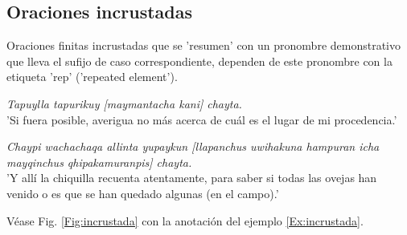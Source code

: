 \documentclass[a4paper,11pt,DIV12]{scrartcl}
\begin{document}
\subsection{Oraciones incrustadas}\label{Sec:incrustada}

Oraciones finitas incrustadas que se 'resumen' con un pronombre demonstrativo que lleva el sufijo de caso correspondiente, dependen de este pronombre con la etiqueta 'rep' ('repeated element').

\begin{examples}
 \item\label{Ex:incrustada} {\em Tapuylla tapurikuy [maymantacha kani] chayta.}\\
      'Si fuera posible, averigua no m\'as acerca de cu\'al es el lugar de mi procedencia.'
 \item {\em Chaypi wachachaqa allinta yupaykun [llapanchus uwihakuna hampuran icha mayqinchus qhipakamuranpis] chayta.}\\
      'Y all\'i la chiquilla recuenta atentamente, para saber si todas las ovejas han venido o es que se han quedado algunas (en el campo).'\\
  	\hfill{\small \citep[266-267]{Cusi2}}
\end{examples}

V\'ease Fig. \ref{Fig:incrustada} con la anotaci\'on del ejemplo \ref{Ex:incrustada}.
\end{document}
